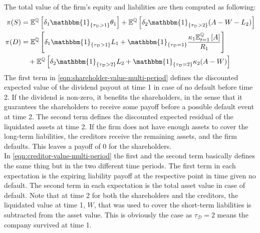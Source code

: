 \documentclass[main.tex]{subfiles}
\begin{document}
        The total value of the firm's equity and liabilities are then computed as following:
        \begin{align}
            \pi(S)&=
            \mathbb{E}^{\rnmeasure}\left[
                \delta_1\mathbbm{1}_{\{\tau_{\mathcal{D}}>1\}} \theta_1\right]
                +
                \mathbb{E}^{\rnmeasure}\left[\delta_{2}\mathbbm{1}_{\{\tau_{\mathcal{D}}>2\}} (A-W-L_{2})
            \right]
            \label{eqn:shareholder-value-multi-period}
            \\
            \nonumber
            \pi(D)&=
            \mathbb{E}^{\rnmeasure}\left[
                \delta_1\mathbbm{1}_{\{\tau_{\mathcal{D}}>1\}} L_1 + \mathbbm{1}_{\{\tau_{\mathcal{D}}=1\}} 
                \frac{
                    \kappa_1 \mathbb{E}_{t=1}^{\rnmeasure}\left[A\right]
                }{
                    R_1
                }
            \right]
            \\
            &\quad+
            \mathbb{E}^{\rnmeasure}\left[
                \delta_{2}\mathbbm{1}_{\{\tau_{\mathcal{D}}>2\}}L_{2}
                +
                \mathbbm{1}_{\{\tau_{\mathcal{D}}=2\}}\kappa_{2}(A-W)
            \right]
            \label{eqn:creditor-value-multi-period}
        \end{align}
        The first term in \cref{eqn:shareholder-value-multi-period} defines the discounted expected value of the dividend payout at time 1 in case of no default before time 2.
        If the dividend is non-zero, it benefits the shareholders,
        in the sense that it guarantees the shareholders to receive some payoff before a possible default event at time 2.
        The second term defines the discounted expected residual of the liquidated assets at time 2.
        If the firm does not have enough assets to cover the long-term liabilities, the creditors receive the remaining assets, and the firm defaults.
        This leaves a payoff of 0 for the shareholders.
        \\
        In \cref{eqn:creditor-value-multi-period} the first and the second term basically defines the same thing but in the two different time periods.
        The first term in each expectation is the expiring liability payoff at the respective point in time given no default. The second term in each expectation is the total asset value in case of default. Note that at time 2 for both the shareholders and the creditors, the liquidated value at time 1, $W$, that was used to cover the short-term liabilities is subtracted from the asset value. This is obviously the case as $\tau_{\mathcal{D}}=2$ means the company survived at time 1.
\end{document}
